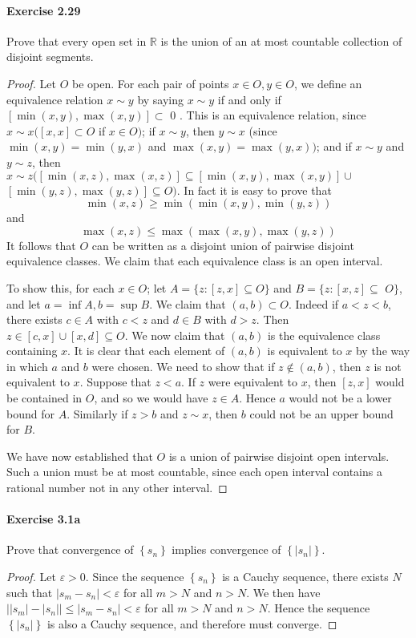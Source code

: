 \documentclass{article}
\theoremstyle{definition}
\begin{document}
\paragraph{Exercise 2.29} Prove that every open set in $\mathbb{R}$ is the union of an at most countable collection of disjoint segments.
\begin{proof}
    Let $O$ be open. For each pair of points $x \in O, y \in O$, we define an equivalence relation $x \sim y$ by saying $x \sim y$ if and only if $[\min (x, y), \max (x, y)] \subset$ 0 . This is an equivalence relation, since $x \sim x([x, x] \subset O$ if $x \in O)$; if $x \sim y$, then $y \sim x$ (since $\min (x, y)=\min (y, x)$ and $\max (x, y)=\max (y, x))$; and if $x \sim y$ and $y \sim z$, then $x \sim z([\min (x, z), \max (x, z)] \subseteq[\min (x, y), \max (x, y)] \cup$ $[\min (y, z), \max (y, z)] \subseteq O)$. In fact it is easy to prove that
$$
\min (x, z) \geq \min (\min (x, y), \min (y, z))
$$
and
$$
\max (x, z) \leq \max (\max (x, y), \max (y, z))
$$
It follows that $O$ can be written as a disjoint union of pairwise disjoint equivalence classes. We claim that each equivalence class is an open interval.

To show this, for each $x \in O$; let $A=\{z:[z, x] \subseteq O\}$ and $B=\{z:[x, z] \subseteq$ $O\}$, and let $a=\inf A, b=\sup B$. We claim that $(a, b) \subset O$. Indeed if $a<z<b$, there exists $c \in A$ with $c<z$ and $d \in B$ with $d>z$. Then $z \in[c, x] \cup[x, d] \subseteq O$. We now claim that $(a, b)$ is the equivalence class containing $x$. It is clear that each element of $(a, b)$ is equivalent to $x$ by the way in which $a$ and $b$ were chosen. We need to show that if $z \notin(a, b)$, then $z$ is not equivalent to $x$. Suppose that $z<a$. If $z$ were equivalent to $x$, then $[z, x]$ would be contained in $O$, and so we would have $z \in A$. Hence $a$ would not be a lower bound for $A$. Similarly if $z>b$ and $z \sim x$, then $b$ could not be an upper bound for $B$.

We have now established that $O$ is a union of pairwise disjoint open intervals. Such a union must be at most countable, since each open interval contains a rational number not in any other interval.
\end{proof}



\paragraph{Exercise 3.1a} Prove that convergence of $\left\{s_{n}\right\}$ implies convergence of $\left\{\left|s_{n}\right|\right\}$.
\begin{proof}
    Let $\varepsilon>0$. Since the sequence $\left\{s_n\right\}$ is a Cauchy sequence, there exists $N$ such that $\left|s_m-s_n\right|<\varepsilon$ for all $m>N$ and $n>N$. We then have $\left| |s_m| - |s_n| \right| \leq\left|s_m-s_n\right|<\varepsilon$ for all $m>N$ and $n>N$. Hence the sequence $\left\{\left|s_n\right|\right\}$ is also a Cauchy sequence, and therefore must converge.
\end{proof}
\end{document}
